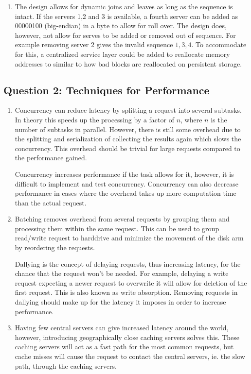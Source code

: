\documentclass[10pt,a4paper]{article}
\begin{document}
\begin{enumerate}
	\item The design allows for dynamic joins and leaves as long as the sequence is intact. If the servers 1,2 and 3 is available, a fourth server can be added as 00000100 (big-endian) in a byte to allow for roll over. The design does, however, not allow for serves to be added or removed out of sequence. For example removing server 2 gives the invalid sequence $1,3,4$. To accommodate for this, a centralized service layer could be added to reallocate memory addresses to similar to how bad blocks are reallocated on persistent storage.
	
	
\end{enumerate}

\subsection*{Question 2: Techniques for Performance}
\begin{enumerate}
	\item 
	Concurrency can reduce latency by splitting a request into several subtasks. In theory this speeds up the processing by a factor of $n$, where $n$ is the number of subtasks in parallel. However, there is still some overhead due to the splitting and serialization of collecting the results again which slows the concurrency. This overhead should be trivial for large requests compared to the performance gained.
	
	Concurrency increases performance if the task allows for it, however, it is difficult to implement and test concurrency. Concurrency can also decrease performance in cases where the overhead takes up more computation time than the actual request.
	
	\item
	Batching removes overhead from several requests by grouping them and processing them within the same request. This can be used to group read/write request to harddrive and minimize the movement of the disk arm by reordering the requests.
	
	Dallying is the concept of delaying requests, thus increasing latency, for the chance that the request won't be needed. For example, delaying a write request expecting a newer request to overwrite it will allow for deletion of the first request. This is also known as write absorption. Removing requests in dallying should make up for the latency it imposes in order to increase performance. 
	
	\item
	Having few central servers can give increased latency around the world, however, introducing geographically close caching servers solves this. These caching servers will act as a fast path for the most common requests, but cache misses will cause the request to contact the central servers, ie. the slow path, through the caching servers.
	
\end{enumerate}
\end{document}
